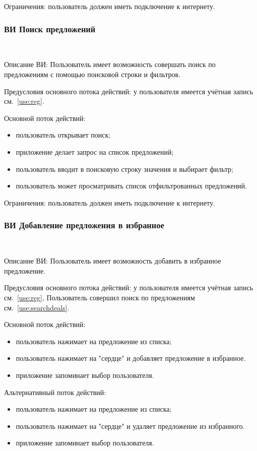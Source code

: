 Ограничения: пользователь должен иметь подключение к интернету.

\subsubsection{ВИ Поиск предложений}~\par
\label{use:searchdeals}
Описание ВИ: Пользователь имеет возможность совершать поиск по предложениям с помощью поисковой строки и фильтров.
 
Предусловия основного потока действий: у пользователя имеется учётная запись см.~\ref{use:reg}.
 
Основной поток действий:
\begin{itemize}
   \item пользователь открывает поиск;
   \item приложение делает запрос на список предложений;
   \item пользователь вводит в поисковую строку значения и выбирает фильтр;
   \item пользователь может просматривать список отфильтрованных предложений.
\end{itemize}
 
Ограничения: пользователь должен иметь подключение к интернету.

\subsubsection{ВИ Добавление предложения в избранное}~\par
\label{use:favoritedeals}
Описание ВИ: Пользователь имеет возможность добавить в избранное предложение.
 
Предусловия основного потока действий: у пользователя имеется учётная запись см.~\ref{use:reg}, Пользователь совершил поиск по предложениям см.~\ref{use:searchdeals}.
 
Основной поток действий:
\begin{itemize}
   \item пользователь нажимает на предложение из списка;
   \item пользователь нажимает на "сердце" и добавляет предложение в избранное.
   \item приложение запоминает выбор пользователя.
\end{itemize}

Альтернативный поток действий:
\begin{itemize}
   \item пользователь нажимает на предложение из списка;
   \item пользователь нажимает на "сердце" и удаляет предложение из избранного.
   \item приложение запоминает выбор пользователя.
\end{itemize}

